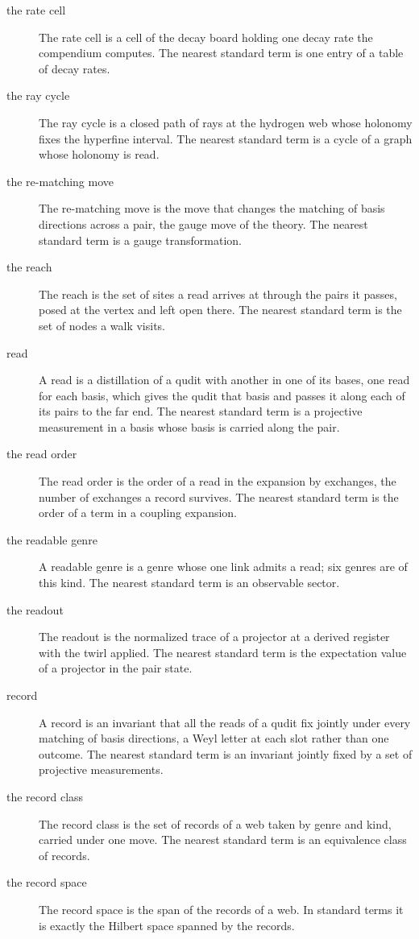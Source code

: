 \begin{description}
\item[the rate cell] The rate cell is a cell of the decay board holding one decay rate the compendium computes. The nearest standard term is one entry of a table of decay rates.
\item[the ray cycle] The ray cycle is a closed path of rays at the hydrogen web whose holonomy fixes the hyperfine interval. The nearest standard term is a cycle of a graph whose holonomy is read.
\item[the re-matching move] The re-matching move is the move that changes the matching of basis directions across a pair, the gauge move of the theory. The nearest standard term is a gauge transformation.
\item[the reach] The reach is the set of sites a read arrives at through the pairs it passes, posed at the vertex and left open there. The nearest standard term is the set of nodes a walk visits.
\item[read] A read is a distillation of a qudit with another in one of its bases, one read for each basis, which gives the qudit that basis and passes it along each of its pairs to the far end. The nearest standard term is a projective measurement in a basis whose basis is carried along the pair.
\item[the read order] The read order is the order of a read in the expansion by exchanges, the number of exchanges a record survives. The nearest standard term is the order of a term in a coupling expansion.
\item[the readable genre] A readable genre is a genre whose one link admits a read; six genres are of this kind. The nearest standard term is an observable sector.
\item[the readout] The readout is the normalized trace of a projector at a derived register with the twirl applied. The nearest standard term is the expectation value of a projector in the pair state.
\item[record] A record is an invariant that all the reads of a qudit fix jointly under every matching of basis directions, a Weyl letter at each slot rather than one outcome. The nearest standard term is an invariant jointly fixed by a set of projective measurements.
\item[the record class] The record class is the set of records of a web taken by genre and kind, carried under one move. The nearest standard term is an equivalence class of records.
\item[the record space] The record space is the span of the records of a web. In standard terms it is exactly the Hilbert space spanned by the records.

\end{description}
